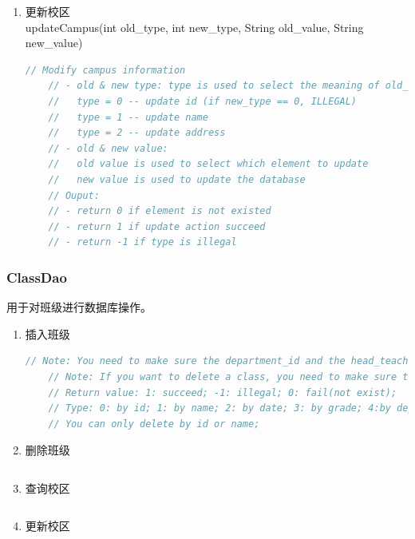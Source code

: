 \documentclass[../report.tex]{subfiles}
\begin{document}
\begin{enumerate}
\item 更新校区\\
updateCampus(int old\_type, int new\_type, String old\_value, String new\_value)
\begin{lstlisting}[language=java,backgroundcolor=\color{lightgray}]
    // Modify campus information
    // - old & new type: type is used to select the meaning of old_value & new_value
    //   type = 0 -- update id (if new_type == 0, ILLEGAL)
    //   type = 1 -- update name
    //   type = 2 -- update address
    // - old & new value:
    //   old value is used to select which element to update
    //   new value is used to update the database
    // Ouput:
    // - return 0 if element is not existed
    // - return 1 if update action succeed
    // - return -1 if type is illegal
\end{lstlisting}
\end{enumerate}

\subsubsection{ClassDao}
用于对班级进行数据库操作。
\begin{enumerate}
\itemsep 0em
\item 插入班级\\
\begin{lstlisting}[language=java,backgroundcolor=\color{lightgray}]
    // Note: You need to make sure the department_id and the head_teacher_id of the new class element exists
    // Note: If you want to delete a class, you need to make sure the class does not have student or transaction.
    // Return value: 1: succeed; -1: illegal; 0: fail(not exist);
    // Type: 0: by id; 1: by name; 2: by date; 3: by grade; 4:by department; 5: by teacher;
    // You can only delete by id or name;
\end{lstlisting}
\item 删除班级\\
\begin{lstlisting}[language=java,backgroundcolor=\color{lightgray}]

\end{lstlisting}
\item 查询校区\\
\begin{lstlisting}[language=java,backgroundcolor=\color{lightgray}]
\end{lstlisting}
\item 更新校区\\
\begin{lstlisting}[language=java,backgroundcolor=\color{lightgray}]
\end{lstlisting}
\end{enumerate}
\end{document}
